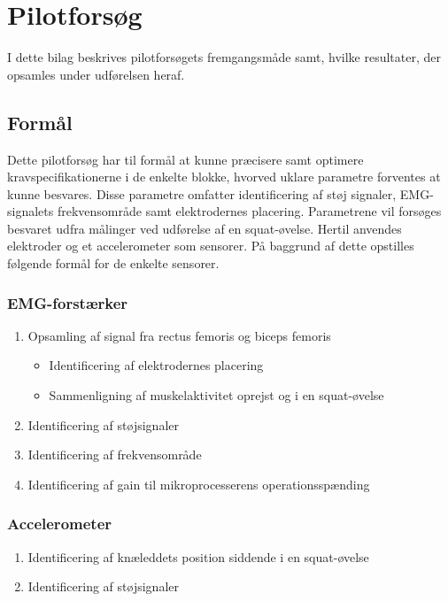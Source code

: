 \section{Pilotforsøg}
I dette bilag beskrives pilotforsøgets fremgangsmåde samt, hvilke resultater, der opsamles under udførelsen heraf. 

\subsection{Formål}
Dette pilotforsøg har til formål at kunne præcisere samt optimere kravspecifikationerne i de enkelte blokke, hvorved uklare parametre forventes at kunne besvares. Disse parametre omfatter identificering af støj signaler, EMG-signalets frekvensområde samt elektrodernes placering. Parametrene vil forsøges besvaret udfra målinger ved udførelse af en squat-øvelse.
Hertil anvendes elektroder og et accelerometer som sensorer. På baggrund af dette opstilles følgende formål for de enkelte sensorer.  

\subsubsection{EMG-forstærker}
\begin{enumerate}
\item Opsamling af signal fra rectus femoris og biceps femoris
\begin{itemize}
\item Identificering af elektrodernes placering
\item Sammenligning af muskelaktivitet oprejst og i en squat-øvelse 
\end{itemize}
\item Identificering af støjsignaler
\item Identificering af frekvensområde
\item Identificering af gain til mikroprocesserens operationsspænding
\end{enumerate}

\subsubsection{Accelerometer}
\begin{enumerate}
\item Identificering af knæleddets position siddende i en squat-øvelse
\item Identificering af støjsignaler
\end{enumerate}

